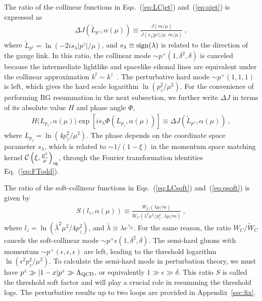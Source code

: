 \documentclass[a4paper,11pt]{article}
\begin{document}
The ratio of the collinear functions in Eqs.~(\ref{eq:LCjet}) and~(\ref{eq:qjet}) is expressed as
\begin{align}\label{eq:DJdef}
\Delta J\left(\tilde{L}_{p^z},\alpha(\mu)\right)
\equiv \frac{ J\left(m/\mu\right) }{ \tilde{J}\left(s_{\lambda} | p^z |/\mu, \, m/\mu \right) } \ ,
\end{align}
where $\tilde{L}_{p^z}=\ln(-2 i s_{\lambda} |p^z|/\mu)$, and $s_{\lambda} \equiv {\rm sign}(\lambda)$ is related to the direction of the gauge link. In this ratio, the collinear mode $\sim p^{+}(1,\delta^2,\delta)$ is canceled because the intermediate lightlike and spacelike eikonal lines are equivalent under the collinear approximation $k^t \sim k^z$~\cite{Ji:2020ect,Ji:2024oka}. The perturbative hard mode $\sim p^{+} (1,1,1)$ is left, which gives the hard scale logarithm $\ln\left(p_z^2/\mu^2\right)$. For the convenience of performing RG resummation in the next subsection, we further write $\Delta J$ in terms of its absolute value $H$ and phase angle $\Phi$,
\begin{align}\label{eq:Hdef}
H\bigg(L_{p_z},\alpha(\mu)\bigg) \exp\left[i s_{\lambda} \Phi(L_{p_z},\alpha(\mu)) \right] \equiv \Delta J\left(\tilde{L}_{p^z},\alpha(\mu)\right)  \ ,
\end{align}
where $L_{p_z} = \ln\left(4 p_z^2/\mu^2\right)$. The phase depends on the coordinate space parameter $s_\lambda$, which is related to $\sim 1/(1-\xi)$ in the momentum space matching kernel $\mathcal{C}\left(\xi,\frac{p^z}{\mu}\right)_{\rm sg}$, through the Fourier transformation identities Eq.~(\ref{eq:FTodd}). 

The ratio of the soft-collinear functions in Eqs.~(\ref{eq:LCsoft}) and~(\ref{eq:qsoft}) is given by
\begin{align}\label{eq:Sdef}
S\left(l_z,\alpha(\mu)\right) \equiv \frac{ W_C\left(\lambda \mu/m \right) }{\tilde W_C\left(\lambda^2 \mu^2/p_z^2, \, \lambda \mu/m \right) }  \ ,
\end{align}
where $l_z=\ln\left(\bar{\lambda}^2\mu^2/4 p_z^2\right)$, and $\bar{\lambda} \equiv \lambda e^{\gamma_E}$.
For the same reason, the ratio $W_C/\tilde{W}_C$ cancels the soft-collinear mode $\sim p^{+}\epsilon(1,\delta^2,\delta)$. The semi-hard gluons with momentum $\sim p^{+} (\epsilon,\epsilon,\epsilon)$ are left,  leading to the threshold logarithm $\ln\left(\epsilon^2 p_z^2/\mu^2\right)$. To calculate the semi-hard mode in perturbation theory, we must have $p^z \gg |1-x| p^z \gg \Lambda_{\rm QCD}$, or equivalently $1 \gg \epsilon \gg \delta$. This ratio $S$ is called the threshold soft factor and will play a crucial role in resumming the threshold logs. The perturbative results up to two loops are provided in Appendix~\ref{sec:fix}.
\end{document}

